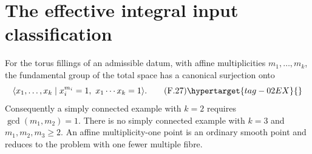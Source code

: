 \section{The effective integral input classification}



\begin{theorem}\hypertarget{tag-02NY}{}\label{maps:src:F.2.7}


For the torus fillings of an admissible datum, with affine
multiplicities $m_1,\ldots,m_k$, the fundamental group of the
total space has a canonical surjection onto
\[
 \langle x_1,\ldots,x_k\mid
       x_i^{m_i}=1,\ x_1\cdots x_k=1\rangle.
 \tag{F.27}\hypertarget{tag-02EX}{}\label{maps:eq:F.27}
\]
Consequently a simply connected example with $k=2$ requires
$\gcd(m_1,m_2)=1$.  There is no simply connected example with
$k=3$ and $m_1,m_2,m_3\geq2$.  An affine multiplicity-one
point is an ordinary smooth point and reduces to the problem
with one fewer multiple fibre.

\end{theorem}


